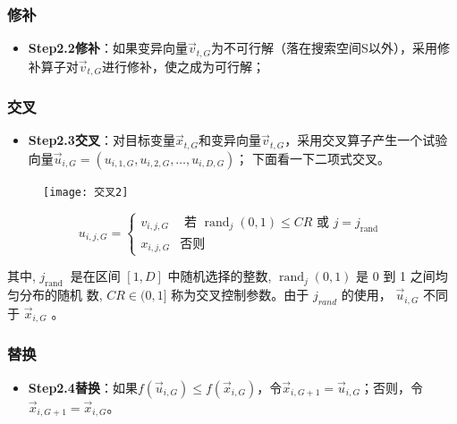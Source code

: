 \documentclass[handout]{beamer}
\begin{document}
		
		
		
		\begin{frame}
			\frametitle{修补}
			\begin{itemize}
				\item\textbf{Step2.2修补}：如果变异向量$\vec{v}_{t, G}$为不可行解（落在搜索空间S以外），采用修补算子对$\vec{v}_{t, G}$进行修补，使之成为可行解；
			\end{itemize}
		\end{frame}
		
		
		
		\begin{frame}
			\frametitle{交叉}
			\begin{itemize}
				\item\textbf{Step2.3交叉}：对目标变量$\vec{x}_{t, G}$和变异向量$\vec{v}_{t, G}$，采用交叉算子产生一个试验向量$\vec{u}_{i, G}=\left(u_{i, 1, G}, u_{i, 2, G}, \ldots, u_{i, D, G}\right)$；
				下面看一下二项式交叉。
			\end{itemize}
		\end{frame}
		
		
		
		\begin{frame}
			\begin{figure}[htbp]
				\centering
				\texttt{[image: 交叉2]}	
			\end{figure}
			$$
			u_{i, j, G}=\left\{\begin{array}{lc}
				v_{i, j, G} & \text { 若 } \operatorname{rand}_{j}(0,1) \leq C R \text { 或 } j=j_{\text {rand }} \\
				x_{i, j, G} & \text {否则  }
			\end{array}\right.
			$$
			
			其中, $j_{\text {rand }}$ 是在区间 $[1, D]$ 中随机选择的整数, $\operatorname{rand}_{j}(0,1)$ 是 0 到 1 之间均匀分布的随机
			数, $C R \in(0,1]$ 称为交叉控制参数。由于 $j_{r a n d}$ 的使用， $\vec{u}_{i, G}$ 不同于 $\vec{x}_{i, G}$ 。
			
			
			
		\end{frame}
		
		
		
		
		
		\begin{frame}
			\frametitle{替换}
			\begin{itemize}
				
				\item\textbf{Step2.4替换}：如果$f\left(\vec{u}_{i, G}\right) \leq f\left(\vec{x}_{i, G}\right)$，令$\vec{x}_{i, G+1}=\vec{u}_{i, G}$；否则，令$\vec{x}_{i, G+1}=\vec{x}_{i, G}$。
			\end{itemize}
		\end{frame}
		
\end{document}
